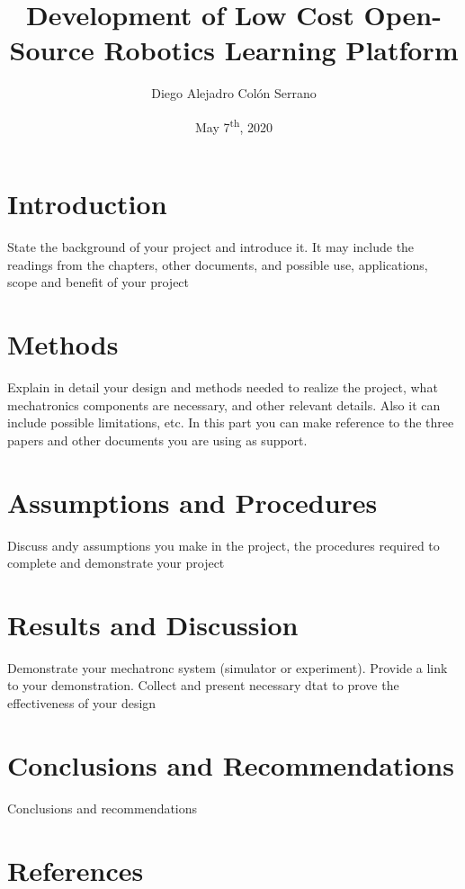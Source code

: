 \documentclass[12pt, letterpaper,titlepage]{report}
\title{Development of Low Cost Open-Source Robotics Learning Platform}
\author{Diego Alejadro Colón Serrano}
\date{May 7\textsuperscript{th}, 2020}
\begin{document}
\maketitle
\tableofcontents
\pagebreak

\section{Introduction}
	State the background of your project and introduce it. It may include the readings from the chapters, other documents, and possible use, applications, scope and benefit of your project

\section{Methods}
	Explain in detail your design and methods needed to realize the project, what mechatronics components are necessary, and other relevant details. Also it can include possible limitations, etc. In this part you can make reference to the three papers and other documents you are using as support.

\section{Assumptions and Procedures}
	Discuss andy assumptions you make in the project, the procedures required to complete and demonstrate your project

\section{Results and Discussion}
	Demonstrate your mechatronc system (simulator or experiment). Provide a link to your demonstration. Collect and present necessary dtat to prove the effectiveness of your design

\section{Conclusions and Recommendations}
	Conclusions and recommendations

\section{References}
\blindtext
\end{document}
